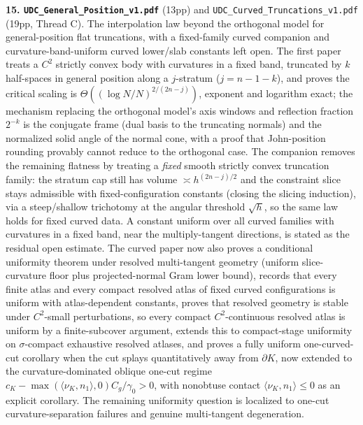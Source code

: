 \documentclass[11pt]{article}
\begin{document}
\textbf{15. \texttt{UDC\_General\_Position\_v1.pdf}} (13pp) and
\texttt{UDC\_Curved\_Truncations\_v1.pdf} (19pp, Thread C).
The interpolation law beyond the orthogonal model for general-position flat
truncations, with a fixed-family curved companion and curvature-band-uniform
curved lower/slab constants left open.  The first paper treats a $C^2$ strictly convex body with curvatures
in a fixed band, truncated by $k$ half-spaces in general position along a
$j$-stratum ($j=n-1-k$), and proves the critical scaling is
$\Theta((\log N/N)^{2/(2n-j)})$, exponent and logarithm exact; the mechanism
replacing the orthogonal model's axis windows and reflection fraction $2^{-k}$
is the conjugate frame (dual basis to the truncating normals) and the normalized
solid angle of the normal cone, with a proof that John-position rounding
provably cannot reduce to the orthogonal case.  The companion removes the
remaining flatness by treating a \emph{fixed} smooth strictly convex truncation
family: the stratum cap still has volume $\asymp h^{(2n-j)/2}$ and the
constraint slice stays admissible with fixed-configuration constants (closing the slicing induction), via a
steep/shallow trichotomy at the angular threshold $\sqrt h$, so the same law
holds for fixed curved data.  A constant uniform over all curved families with
curvatures in a fixed band, near the multiply-tangent directions, is stated as
the residual open estimate.  The curved paper now also proves a conditional
uniformity theorem under resolved multi-tangent geometry (uniform slice-curvature
floor plus projected-normal Gram lower bound), records that every finite atlas
and every compact resolved atlas of fixed curved configurations is uniform with
atlas-dependent constants, proves that resolved geometry is stable under
\(C^2\)-small perturbations, so every compact \(C^2\)-continuous resolved atlas
is uniform by a finite-subcover argument, extends this to compact-stage
uniformity on \(\sigma\)-compact exhaustive resolved atlases, and
proves a fully uniform one-curved-cut corollary when the cut splays quantitatively away
from \(\partial K\), now
extended to the curvature-dominated oblique one-cut regime
\(c_K-\max(\langle\nu_K,n_1\rangle,0)C_g/\gamma_0>0\), with
nonobtuse contact \(\langle\nu_K,n_1\rangle\le0\) as an explicit corollary.
The remaining
uniformity question is localized to one-cut curvature-separation failures and
genuine multi-tangent degeneration.
\end{document}
